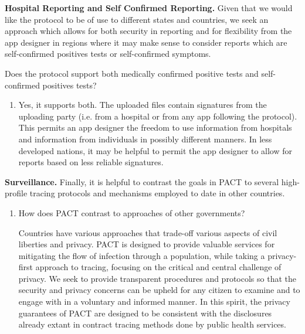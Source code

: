 \documentclass{article}
\begin{document}
\textbf{Hospital Reporting and Self Confirmed Reporting.} 
Given that we would like the protocol to be of use to different states and countries, we seek an approach which allows for both security in reporting and for flexibility from the app designer in regions where it may make sense to  consider reports which are self-confirmed positives tests or self-confirmed symptoms.

Does the protocol support both medically confirmed positive tests and self-confirmed positives tests?
\begin{enumerate}[leftmargin=*]

\item Yes, it supports both. The uploaded files contain signatures from the uploading party (i.e. from a hospital or from any app following the protocol). This permits an app designer the freedom to use information from hospitals and information from individuals in possibly different manners. In less developed nations, it may be helpful to permit the app designer to allow for reports based on less reliable signatures. 

\end{enumerate}

\textbf{Surveillance.} 
Finally, it is helpful to contrast the goals in PACT to several high-profile tracing protocols and mechanisms employed to date in other countries.

\begin{enumerate}[leftmargin=*]
\item How does PACT contrast to approaches of other governments?

Countries have various approaches that trade-off various aspects of civil liberties and privacy.  PACT is designed to provide valuable services for mitigating the flow of infection through a population, while taking a privacy-first approach to tracing, focusing on the critical and central challenge of privacy. We seek to provide transparent procedures and protocols so that the security and privacy concerns can be upheld for any citizen to examine and to engage with in a voluntary and informed manner.  In this spirit, the privacy guarantees of PACT are designed to be consistent with the disclosures already extant in contract tracing methods done by public health services. 

\end{enumerate}
\end{document}
